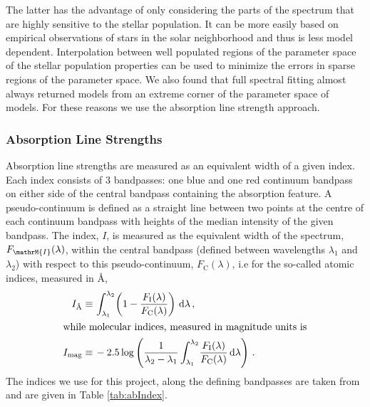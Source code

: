 	 	The latter has the advantage of only considering the parts of the spectrum that are highly sensitive to the stellar population. It can be more easily based on empirical observations of stars in the solar neighborhood and thus is less model dependent. Interpolation between well populated regions of the parameter space of the stellar population properties can be used to minimize the errors in sparse regions of the parameter space. We also found that full spectral fitting almost always returned models from an extreme corner of the parameter space of models. For these reasons we use the absorption line strength approach.

	 	\subsubsection{Absorption Line Strengths}
	 		\label{subsubsec:Absorption}
	 		Absorption line strengths are measured as an equivalent width of a given index. Each index consists of 3 bandpasses: one blue and one red continuum bandpass on either side of the central bandpass containing the absorption feature. A pseudo-continuum is defined as a straight line between two points at the centre of each continuum bandpass with heights of the median intensity of the given bandpass. The index, $I$, is measured as the equivalent width of the spectrum, $F_\mathrM{I}(\lambda)$, within the central bandpass (defined between wavelengths $\lambda_1$ and $\lambda_2$) with respect to this pseudo-continuum, $F_\mathrm{C}(\lambda)$, i.e for the so-called atomic indices, measured in \AA,
	 		\begin{align}
	 			I_\text{\AA} \equiv \, & \int^{\lambda_2}_{\lambda_1} \! \left(1 - \frac{F_\mathrm{I}(\lambda)}{F_\mathrm{C}(\lambda)}\right) \, \mathrm{d}\lambda \, , \\
	 		\intertext{while molecular indices, measured in magnitude units is}
	 			I_\text{mag} \equiv \, & -2.5 \log\left(\frac{1}{\lambda_2 - \lambda_1} \int^{\lambda_2}_{\lambda_1} \! \frac{F_\mathrm{I}(\lambda)}{F_\mathrm{C}(\lambda)} \, \mathrm{d}\lambda\right) \, .
	 		\end{align}
	 		The indices we use for this project, along the defining bandpasses are taken from \citet{Trager1998} and are given in Table \ref{tab:abIndex}.


